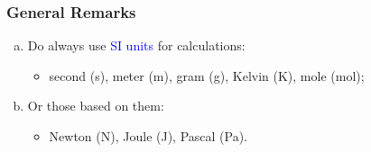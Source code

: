 \documentclass[10pt,compress]{beamer}
\begin{document}
\begin{frame}
 \frametitle{General Remarks}
  \begin{enumerate}[(a)]
   \item <1-> Do always use \textcolor{blue}{SI units} for calculations:
     \begin{itemize}
       \item<1-> second (s), meter (m), gram (g), Kelvin (K), mole (mol);
     \end{itemize}
   \item<2-> Or those based on them:
     \begin{itemize}
       \item<2-> Newton (N), Joule (J), Pascal (Pa).
     \end{itemize}
  \end{enumerate}

  \begin{center}
  \end{center}
\end{frame}
\end{document}
